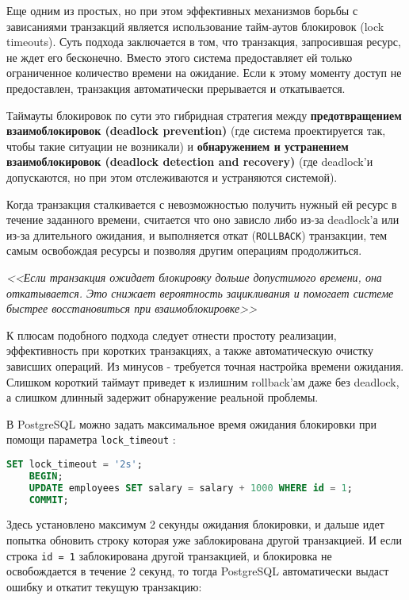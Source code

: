 Еще одним из простых, но при этом эффективных механизмов борьбы с зависаниями транзакций является использование тайм-аутов блокировок (lock timeouts). Суть подхода заключается в том, что транзакция, запросившая ресурс, не ждет его бесконечно. Вместо этого система предоставляет ей только ограниченное количество времени на ожидание. Если к этому моменту доступ не предоставлен, транзакция автоматически прерывается и откатывается. \autocite[ch.18]{Silberschatz}

Таймауты блокировок по сути это гибридная стратегия между \textbf{предотвращением взаимоблокировок (deadlock prevention)} (где система проектируется так, чтобы такие ситуации не возникали) и \textbf{обнаружением и устранением взаимоблокировок (deadlock detection and recovery)} (где deadlock'и допускаются, но при этом отслеживаются и устраняются системой).

Когда транзакция сталкивается с невозможностью получить нужный ей ресурс в течение заданного времени, считается что оно зависло либо из-за deadlock'а или из-за длительного ожидания, и выполняется откат (\texttt{ROLLBACK}) транзакции, тем самым освобождая ресурсы и позволяя другим операциям продолжиться.

\begin{grayquote}
    \textit{<<Если транзакция ожидает блокировку дольше допустимого времени, она откатывается. Это снижает вероятность зацикливания и помогает системе быстрее восстановиться при взаимоблокировке>>} \autocite[ch.18]{Silberschatz}
\end{grayquote}

К плюсам подобного подхода следует отнести простоту реализации, эффективность при коротких транзакциях, а также автоматическую очистку зависших операций.
Из минусов - требуется точная настройка времени ожидания. Слишком короткий таймаут приведет к излишним rollback'ам даже без deadlock, а слишком длинный задержит обнаружение реальной проблемы. \autocite[ch.22]{ElmasriNavathe}

В PostgreSQL можно задать максимальное время ожидания блокировки при помощи параметра \texttt{lock\_timeout} \autocite[§19.11]{PostgreSQLdocc19}:
\begin{lstlisting}[language=SQL]
    SET lock_timeout = '2s';
    BEGIN;
    UPDATE employees SET salary = salary + 1000 WHERE id = 1;
    COMMIT;
\end{lstlisting}

Здесь установлено максимум 2 секунды ожидания блокировки, и дальше идет попытка обновить строку которая уже заблокирована другой транзакцией. И если строка \texttt{id = 1} заблокирована другой транзакцией, и блокировка не освобождается в течение 2 секунд, то тогда PostgreSQL автоматически выдаст ошибку и откатит текущую транзакцию:

